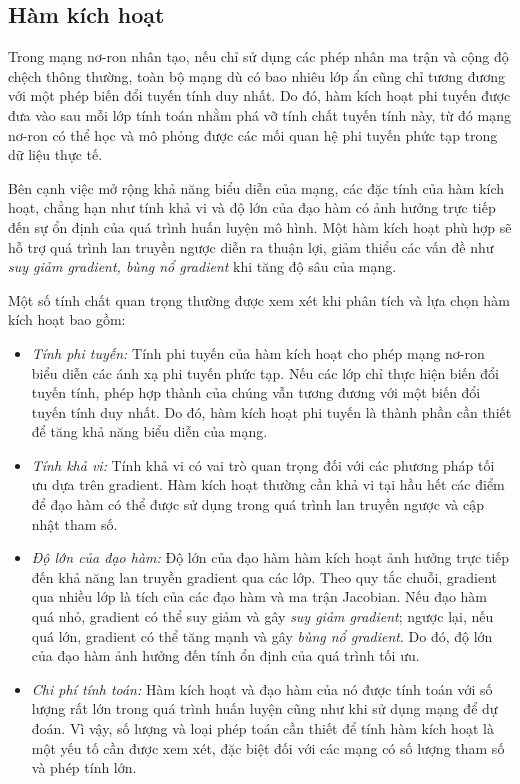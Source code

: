 \subsection{Hàm kích hoạt}
Trong mạng nơ-ron nhân tạo, nếu chỉ sử dụng các phép nhân ma trận và cộng độ chệch thông thường, toàn bộ mạng dù có bao nhiêu lớp ẩn cũng chỉ tương đương với một phép biến đổi tuyến tính duy nhất.
Do đó, hàm kích hoạt phi tuyến được đưa vào sau mỗi lớp tính toán nhằm phá vỡ tính chất tuyến tính này, từ đó mạng nơ-ron có thể học và mô phỏng được các mối quan hệ phi tuyến phức tạp trong dữ liệu thực tế.

Bên cạnh việc mở rộng khả năng biểu diễn của mạng, các đặc tính của hàm kích hoạt, chẳng hạn như tính khả vi và độ lớn của đạo hàm có ảnh hưởng trực tiếp đến sự ổn định của quá trình huấn luyện mô hình. 
Một hàm kích hoạt phù hợp sẽ hỗ trợ quá trình lan truyền ngược diễn ra thuận lợi, giảm thiểu các vấn đề như \textit{suy giảm gradient, bùng nổ gradient} khi tăng độ sâu của mạng.

Một số tính chất quan trọng thường được xem xét khi phân tích và lựa chọn hàm kích hoạt bao gồm:
\begin{itemize}
\item \textit{Tính phi tuyến:} Tính phi tuyến của hàm kích hoạt cho phép mạng nơ-ron biểu diễn các ánh xạ phi tuyến phức tạp. Nếu các lớp chỉ thực hiện biến đổi tuyến tính, phép hợp thành của chúng vẫn tương đương với một biến đổi tuyến tính duy nhất. Do đó, hàm kích hoạt phi tuyến là thành phần cần thiết để tăng khả năng biểu diễn của mạng.

\item \textit{Tính khả vi:} Tính khả vi có vai trò quan trọng đối với các phương pháp tối ưu dựa trên gradient. Hàm kích hoạt thường cần khả vi tại hầu hết các điểm để đạo hàm có thể được sử dụng trong quá trình lan truyền ngược và cập nhật tham số. 

\item \textit{Độ lớn của đạo hàm:} Độ lớn của đạo hàm hàm kích hoạt ảnh hưởng trực tiếp đến khả năng lan truyền gradient qua các lớp. Theo quy tắc chuỗi, gradient qua nhiều lớp là tích của các đạo hàm và ma trận Jacobian. Nếu đạo hàm quá nhỏ, gradient có thể suy giảm và gây \textit{suy giảm gradient}; ngược lại, nếu quá lớn, gradient có thể tăng mạnh và gây \textit{bùng nổ gradient}. Do đó, độ lớn của đạo hàm ảnh hưởng đến tính ổn định của quá trình tối ưu.

\item \textit{Chi phí tính toán:} Hàm kích hoạt và đạo hàm của nó được tính toán với số lượng rất lớn trong quá trình huấn luyện cũng như khi sử dụng mạng để dự đoán. Vì vậy, số lượng và loại phép toán cần thiết để tính hàm kích hoạt là một yếu tố cần được xem xét, đặc biệt đối với các mạng có số lượng tham số và phép tính lớn.
\end{itemize}

